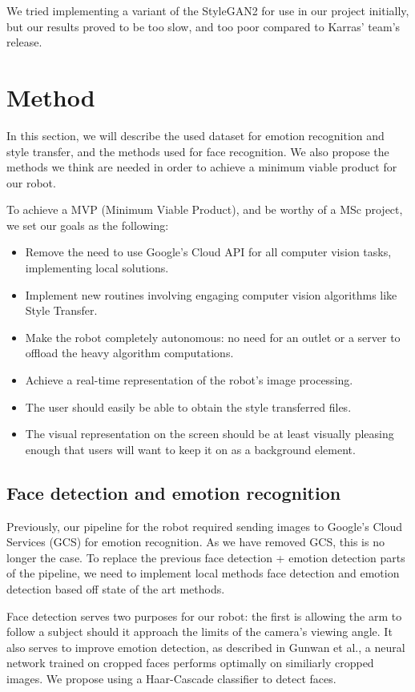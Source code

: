 \documentclass[journal,onecolumn]{IEEEtran}
\begin{document}
We tried implementing a variant of the StyleGAN2 for use in our project initially, but our results proved to be too slow, and too poor compared to Karras' team's release. 

\section{Method}

In this section, we will describe the used dataset for emotion recognition and style transfer, and the methods used for face recognition. We also propose the methods we think are needed in order to achieve a minimum viable product for our robot.


To achieve a MVP (Minimum Viable Product), and be worthy of a MSc project, we set our goals as the following:
\begin{itemize}
  \item Remove the need to use Google's Cloud API for all computer vision tasks, implementing local solutions.
  \item Implement new routines involving engaging computer vision algorithms like Style Transfer.
  \item Make the robot completely autonomous: no need for an outlet or a server to offload the heavy algorithm computations.
  \item Achieve a real-time representation of the robot's image processing.
  \item The user should easily be able to obtain the style transferred files.
  \item The visual representation on the screen should be at least visually pleasing enough that users will want to keep it on as a background element.
\end{itemize}

\subsection{Face detection and emotion recognition}

Previously, our pipeline for the robot required sending images to Google's Cloud Services (GCS) for emotion recognition. As we have removed GCS, this is no longer the case. To replace the previous face detection + emotion detection parts of the pipeline, we need to implement local methods face detection and emotion detection based off state of the art methods. 

Face detection serves two purposes for our robot: the first is allowing the arm to follow a subject should it approach the limits of the camera's viewing angle. It also serves to improve emotion detection, as described in Gunwan et al.\cite{haarcrop}, a neural network trained on cropped faces performs optimally on similiarly cropped images. We propose using a Haar-Cascade classifier to detect faces.
\end{document}

